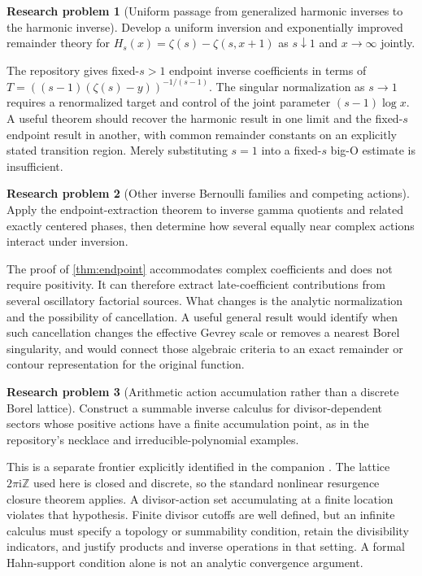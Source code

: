 \documentclass[11pt,a4paper]{article}
\theoremstyle{definition}
\newtheorem{problem}{Research problem}
\numberwithin{equation}{section}
\newcommand{\ii}{\mathrm{i}}
\begin{document}
\begin{problem}[Uniform passage from generalized harmonic inverses to the harmonic inverse]
Develop a uniform inversion and exponentially improved remainder theory for
$H_s(x)=\zeta(s)-\zeta(s,x+1)$ as $s\downarrow1$ and $x\to\infty$ jointly.
\end{problem}
The repository gives fixed-$s>1$ endpoint inverse coefficients in terms of
$T=((s-1)(\zeta(s)-y))^{-1/(s-1)}$. The singular normalization as $s\to1$ requires a renormalized target and control of the joint parameter $(s-1)\log x$. A useful theorem should recover the harmonic result in one limit and the fixed-$s$ endpoint result in another, with common remainder constants on an explicitly stated transition region. Merely substituting $s=1$ into a fixed-$s$ big-O estimate is insufficient.

\begin{problem}[Other inverse Bernoulli families and competing actions]
Apply the endpoint-extraction theorem to inverse gamma quotients and related exactly centered phases, then determine how several equally near complex actions interact under inversion.
\end{problem}
The proof of \cref{thm:endpoint} accommodates complex coefficients and does not require positivity. It can therefore extract late-coefficient contributions from several oscillatory factorial sources. What changes is the analytic normalization and the possibility of cancellation. A useful general result would identify when such cancellation changes the effective Gevrey scale or removes a nearest Borel singularity, and would connect those algebraic criteria to an exact remainder or contour representation for the original function.

\begin{problem}[Arithmetic action accumulation rather than a discrete Borel lattice]
Construct a summable inverse calculus for divisor-dependent sectors whose positive actions have a finite accumulation point, as in the repository's necklace and irreducible-polynomial examples.
\end{problem}
This is a separate frontier explicitly identified in the companion \cite{repo}. The lattice $2\pi\ii\mathbb Z$ used here is closed and discrete, so the standard nonlinear resurgence closure theorem applies. A divisor-action set accumulating at a finite location violates that hypothesis. Finite divisor cutoffs are well defined, but an infinite calculus must specify a topology or summability condition, retain the divisibility indicators, and justify products and inverse operations in that setting. A formal Hahn-support condition alone is not an analytic convergence argument.
\end{document}
